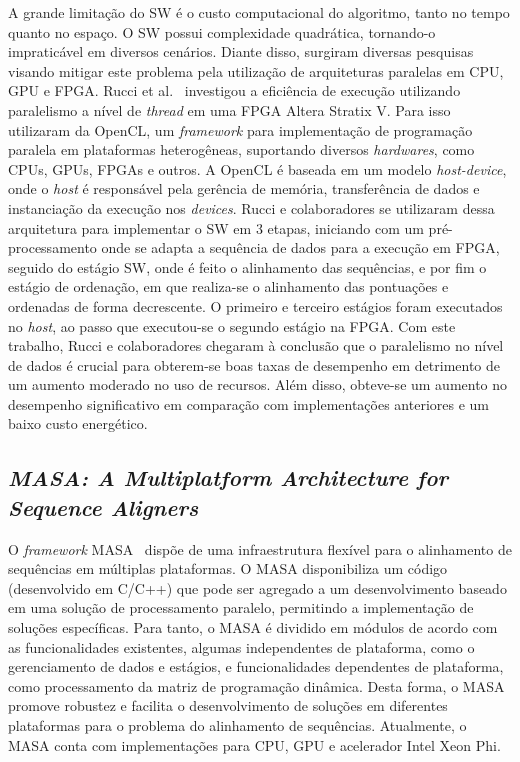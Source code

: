 \documentclass[12pt, a4paper]{article}
\numberwithin{table}{section}
\begin{document}
A grande limitação do SW é o custo computacional do algoritmo, tanto no tempo
quanto no espaço. O SW possui complexidade quadrática, tornando-o impraticável em
diversos cenários. Diante disso, surgiram diversas pesquisas visando mitigar este problema
pela utilização de arquiteturas paralelas em CPU, GPU e FPGA. 
Rucci et al.~\cite{7345650} investigou a eficiência de execução utilizando paralelismo a 
nível de \textit{thread} em uma FPGA Altera Stratix V. Para isso utilizaram da 
OpenCL, um \textit{framework} para implementação de programação paralela em
plataformas heterogêneas, suportando diversos \textit{hardwares}, como CPUs,
GPUs, FPGAs e outros. A OpenCL é baseada em um modelo \textit{host-device}, 
onde o \textit{host} é responsável pela gerência de memória, transferência de dados e 
instanciação da execução nos \textit{devices}.
Rucci e colaboradores se utilizaram dessa arquitetura para implementar o SW em 3 etapas, iniciando com um pré-processamento
onde se adapta a sequência de dados para a execução em FPGA, seguido do estágio SW, onde é feito
o alinhamento das sequências, e por fim o estágio de ordenação, em que realiza-se o alinhamento das pontuações e ordenadas de forma decrescente. O primeiro e terceiro estágios foram executados no \textit{host}, ao passo que executou-se o segundo estágio na FPGA.
Com este trabalho, Rucci e colaboradores chegaram à conclusão que o paralelismo no nível de dados é 
crucial para obterem-se boas taxas de desempenho em detrimento de um aumento moderado no uso
de recursos. Além disso, obteve-se um aumento no desempenho significativo em comparação
com implementações anteriores e um baixo custo energético.

\subsection {\textit{MASA: A Multiplatform Architecture for Sequence Aligners}}

O \textit{framework} MASA~\cite{DeO.Sandes:2016:MMA:2888415.2858656} 
dispõe de uma infraestrutura flexível para o alinhamento de 
sequências em múltiplas plataformas. O MASA disponibiliza um 
código (desenvolvido em C/C++) que pode ser agregado a um desenvolvimento 
baseado em uma solução de processamento paralelo, permitindo a implementação
de soluções específicas. Para tanto, o MASA é dividido em módulos de acordo 
com as funcionalidades existentes, algumas independentes de plataforma, como
o gerenciamento de dados e estágios, e funcionalidades dependentes de plataforma, 
como processamento da matriz de programação dinâmica. Desta forma, o MASA promove 
robustez e facilita o desenvolvimento de soluções em diferentes plataformas 
para o problema do alinhamento de sequências. Atualmente, o MASA conta com 
implementações para CPU, GPU e acelerador Intel Xeon Phi.
\end{document}
